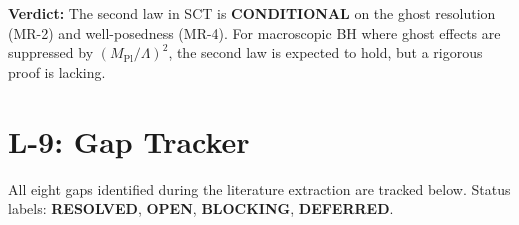 \documentclass[12pt,a4paper]{article}
\theoremstyle{definition}
\theoremstyle{remark}
\begin{document}
\begin{tcolorbox}[colback=orange!5, colframe=orange!60!black]
\textbf{Verdict:} The second law in SCT is \textbf{CONDITIONAL}
on the ghost resolution (MR-2) and well-posedness (MR-4).
For macroscopic BH where ghost effects are suppressed by
$(M_{\mathrm{Pl}}/\Lambda)^2$, the second law is expected to
hold, but a rigorous proof is lacking.
\end{tcolorbox}


\section{L-9: Gap Tracker}
\label{sec:L9}

All eight gaps identified during the literature extraction are tracked
below.  Status labels: \textcolor{green!50!black}{\textbf{RESOLVED}},
\textcolor{orange!80!black}{\textbf{OPEN}},
\textcolor{red!80!black}{\textbf{BLOCKING}},
\textcolor{blue!60!black}{\textbf{DEFERRED}}.
\end{document}
